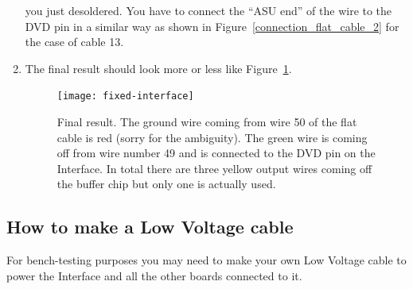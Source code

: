 \begin{enumerate}
  you just desoldered. You have to connect the ``ASU end'' of the wire to the
  DVD pin in a similar way as shown in Figure~\ref{connection_flat_cable_2} for
  the case of cable 13.
\item The final result should look more or less like
  Figure~\ref{fixed-interface}.
  \begin{figure}[ht]
    \centering \texttt{[image: fixed-interface]}
    \caption{Final result. The ground wire coming from wire 50 of
      the flat cable is red (sorry for the ambiguity). The green
      wire is coming off from wire number 49 and is connected to the DVD pin on
      the Interface. In total there are three yellow output wires coming off the
      buffer chip but only one is actually used.}\label{fixed-interface}
  \end{figure}
\end{enumerate}

\subsection{How to make a Low Voltage cable}\label{sec:how-make-low-voltage-cable}
For bench-testing purposes you may need to make your own Low Voltage cable to
power the Interface and all the other boards connected to it.

